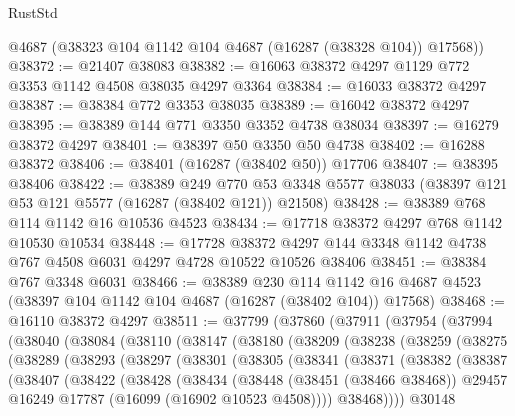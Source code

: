 \begin{lexlean}{RustStd}
\begin{coremodule}
      @4687
      (@38323 @104 @1142 @104 @4687 (@16287 (@38328 @104)) @17568))
@38372 := @21407 @38083
@38382 := @16063 @38372 @4297 @1129 @772 @3353 @1142 @4508 @38035 @4297 @3364
@38384 := @16033 @38372 @4297
@38387 := @38384 @772 @3353 @38035
@38389 := @16042 @38372 @4297
@38395 := @38389 @144 @771 @3350 @3352 @4738 @38034
@38397 := @16279 @38372 @4297
@38401 := @38397 @50 @3350 @50 @4738
@38402 := @16288 @38372
@38406 := @38401 (@16287 (@38402 @50)) @17706
@38407 := @38395 @38406
@38422 := @38389
    @249
    @770
    @53
    @3348
    @5577
    @38033
    (@38397 @121 @53 @121 @5577 (@16287 (@38402 @121)) @21508)
@38428 := @38389 @768 @114 @1142 @16 @10536 @4523
@38434 := @17718 @38372 @4297 @768 @1142 @10530 @10534
@38448 := @17728
    @38372
    @4297
    @144
    @3348
    @1142
    @4738
    @767
    @4508
    @6031
    @4297
    @4728
    @10522
    @10526
    @38406
@38451 := @38384 @767 @3348 @6031
@38466 := @38389
    @230
    @114
    @1142
    @16
    @4687
    @4523
    (@38397 @104 @1142 @104 @4687 (@16287 (@38402 @104)) @17568)
@38468 := @16110 @38372 @4297
@38511 := @37799
    (@37860
      (@37911
        (@37954
          (@37994
            (@38040
              (@38084
                (@38110
                  (@38147
                    (@38180
                      (@38209
                        (@38238
                          (@38259
                            (@38275
                              (@38289
                                (@38293
                                  (@38297
                                    (@38301
                                      (@38305
                                        (@38341
                                          (@38371
                                            (@38382
                                              (@38387
                                                (@38407
                                                  (@38422
                                                    (@38428
                                                      (@38434
                                                        (@38448
                                                          (@38451 (@38466 @38468))
                                                          @29457
                                                          @16249
                                                          @17787
                                                          (@16099 (@16902 @10523 @4508))))
                                                      @38468))))
                                              @30148

\end{coremodule}
\end{lexlean}
